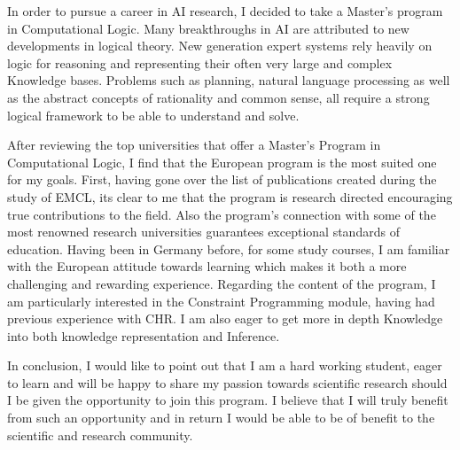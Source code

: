 \documentclass[10pt,stdletter,dateno,sigleft]{newlfm} %
\begin{document}
\begin{newlfm}
  In order to pursue a career in AI research, I decided to take a Master's program in
  Computational Logic. Many breakthroughs in AI are attributed to new
  developments in logical theory. New generation expert systems rely heavily on
  logic for reasoning and representing their often very large and complex
  Knowledge bases. Problems such as planning, natural language processing as
  well as the abstract concepts of rationality and common sense, all require
  a strong logical framework to be able to understand and solve.

  After reviewing the top universities that offer a Master's Program in
  Computational Logic, I find that the European program is the most suited one
  for my goals. First, having gone over the list of publications created during
  the study of EMCL, its clear to me that the program is research directed
  encouraging true contributions to the field. Also the program's connection
  with some of the most renowned research universities guarantees exceptional
  standards of education. Having been in Germany before, for some study courses,
  I am familiar with the European attitude towards learning which makes it both
  a more challenging and rewarding experience. Regarding the content of the
  program, I am particularly interested in the Constraint Programming module,
  having had previous experience with CHR. I am also eager to get more in depth
  Knowledge into both knowledge representation and Inference.

  In conclusion, I would like to point out that I am a hard working student,
  eager to learn and will be happy to share my passion towards scientific
  research should I be given the  opportunity to join this program. I believe
  that I will truly benefit from
  such an opportunity and in return I would be able to be of benefit to the
  scientific and research community.

\end{newlfm}
\end{document}
